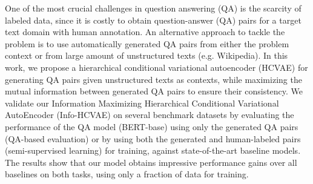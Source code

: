 One of the most crucial challenges in question answering (QA) is the scarcity of labeled data, since it is costly to obtain question-answer (QA) pairs for a target text domain with human annotation. An alternative approach to tackle the problem is to use automatically generated QA pairs from either the problem context or from large amount of unstructured texts (e.g. Wikipedia). In this work, we propose a hierarchical conditional variational autoencoder (HCVAE) for generating QA pairs given unstructured texts as contexts, while maximizing the mutual information between generated QA pairs to ensure their consistency. We validate our Information Maximizing Hierarchical Conditional Variational AutoEncoder (Info-HCVAE) on several benchmark datasets by evaluating the performance of the QA model (BERT-base) using only the generated QA pairs (QA-based evaluation) or by using both the generated and human-labeled pairs (semi-supervised learning) for training, against state-of-the-art baseline models. The results show that our model obtains impressive performance gains over all baselines on both tasks, using only a fraction of data for training.
